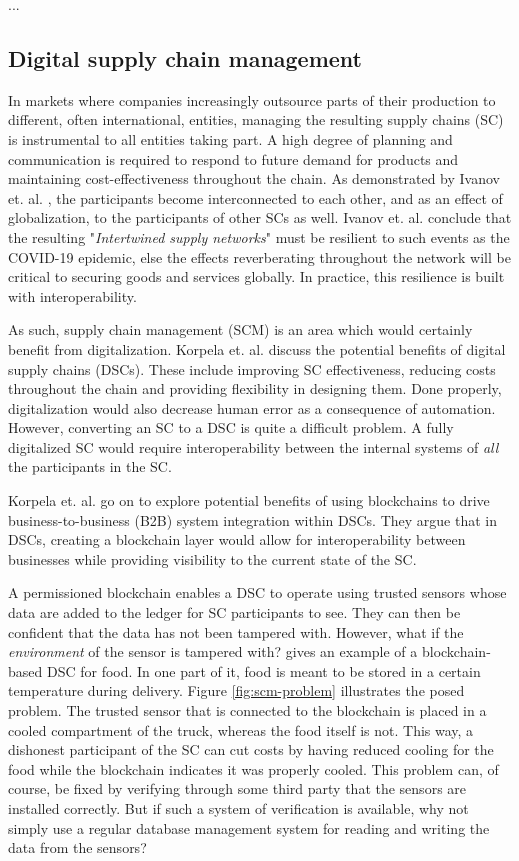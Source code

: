 ...

\subsection{Digital supply chain management}

In markets where companies increasingly outsource parts of their
production to different, often international, entities, managing the
resulting supply chains (SC) is instrumental to all entities taking
part. A high degree of planning and communication is required to
respond to future demand for products and maintaining
cost-effectiveness throughout the chain. As demonstrated by Ivanov et.
al. \cite{ivanovIntertwined}, the participants become interconnected
to each other, and as an effect of globalization, to the participants
of other SCs as well. Ivanov et. al. conclude that the resulting
"\textit{Intertwined supply networks}" must be resilient to such
events as the COVID-19 epidemic, else the effects reverberating
throughout the network will be critical to securing goods and
services globally. In practice, this resilience is built with interoperability.

As such, supply chain management (SCM) is an area which would
certainly benefit from digitalization. Korpela et. al.
\cite{korpelaDSC} discuss the potential benefits of digital supply
chains (DSCs). These include improving SC effectiveness, reducing
costs throughout the chain and providing flexibility in designing
them. Done properly, digitalization would also decrease human error as
a consequence of automation.  However, converting an SC to a DSC is
quite a difficult problem. A fully digitalized SC would require
interoperability between the internal systems of \textit{all} the
participants in the SC.

Korpela et. al. go on to explore potential benefits of using
blockchains to drive business-to-business (B2B) system integration
within DSCs. They argue that in DSCs, creating a blockchain layer
would allow for interoperability between businesses while providing
visibility to the current state of the SC.

A permissioned blockchain enables a DSC to operate using trusted
sensors whose data are added to the ledger for SC participants to see.
They can then be confident that the data has not been tampered with.
However, what if the \textit{environment} of the sensor is tampered
with? \cite{wustBlockchainNeed} gives an example of a blockchain-based
DSC for food. In one part of it, food is meant to be stored in a
certain temperature during delivery. Figure \ref{fig:scm-problem}
illustrates the posed problem. The trusted sensor that is connected to
the blockchain is placed in a cooled compartment of the truck, whereas
the food itself is not. This way, a dishonest participant of the SC
can cut costs by having reduced cooling for the food while the
blockchain indicates it was properly cooled. This problem can, of
course, be fixed by verifying through some third party that the
sensors are installed correctly. But if such a system of verification
is available, why not simply use a regular database management system
for reading and writing the data from the sensors?

